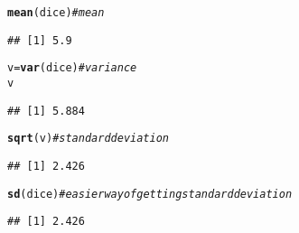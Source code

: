 \documentclass[12pt]{article}\usepackage[]{graphicx}\usepackage[]{color}
\makeatletter
\newcommand{\hlcom}[1]{\textcolor[rgb]{0.678,0.584,0.686}{\textit{#1}}}%
\newcommand{\hlstd}[1]{\textcolor[rgb]{0.345,0.345,0.345}{#1}}%
\newcommand{\hlkwb}[1]{\textcolor[rgb]{0.69,0.353,0.396}{#1}}%
\newcommand{\hlkwd}[1]{\textcolor[rgb]{0.737,0.353,0.396}{\textbf{#1}}}%
\newenvironment{kframe}{%
 \def\at@end@of@kframe{}%
 \ifinner\ifhmode%
  \def\at@end@of@kframe{\end{minipage}}%
  \begin{minipage}{\columnwidth}%
 \fi\fi%
 \def\FrameCommand##1{\hskip\@totalleftmargin \hskip-\fboxsep
 \colorbox{shadecolor}{##1}\hskip-\fboxsep
     \hskip-\linewidth \hskip-\@totalleftmargin \hskip\columnwidth}%
 \MakeFramed {\advance\hsize-\width
   \@totalleftmargin\z@ \linewidth\hsize
   \@setminipage}}%
 {\par\unskip\endMakeFramed%
 \at@end@of@kframe}
\newenvironment{knitrout}{}{} %
\makeatother
\begin{document}
\begin{knitrout}
\begin{kframe}
\begin{alltt}
\hlkwd{mean}\hlstd{(dice)}  \hlcom{#mean}
\end{alltt}
\begin{verbatim}
## [1] 5.9
\end{verbatim}
\begin{alltt}
\hlstd{v} \hlkwb{=} \hlkwd{var}\hlstd{(dice)}  \hlcom{#variance}
\hlstd{v}
\end{alltt}
\begin{verbatim}
## [1] 5.884
\end{verbatim}
\begin{alltt}
\hlkwd{sqrt}\hlstd{(v)}  \hlcom{#standard deviation}
\end{alltt}
\begin{verbatim}
## [1] 2.426
\end{verbatim}
\begin{alltt}
\hlkwd{sd}\hlstd{(dice)}  \hlcom{#easier way of getting standard deviation}
\end{alltt}
\begin{verbatim}
## [1] 2.426
\end{verbatim}
\end{kframe}
\end{knitrout}
\end{document}
